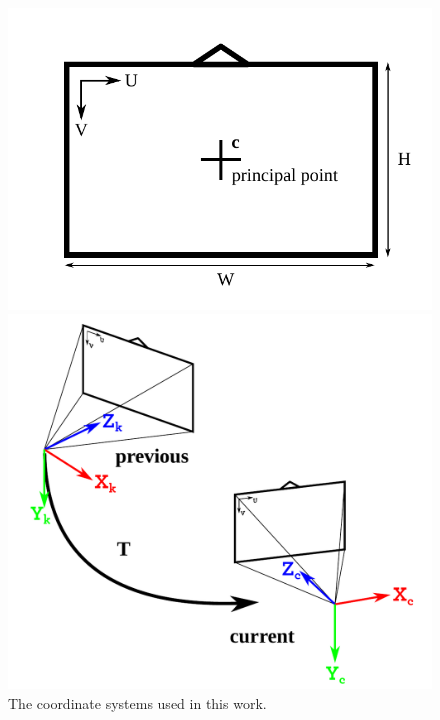\begin{figure}
    \begin{minipage}[t]{0.48\textwidth}
        \includegraphics[width = \textwidth]{images/coordinate_system_camera.pdf}
    \end{minipage}
    \hfill
    \begin{minipage}[t]{0.48\textwidth}
        \includegraphics[width = \textwidth]{images/coordinate_systems_3d.pdf}
    \end{minipage}
    \caption{The coordinate systems used in this work.}
    \label{fig:coordinate_systems}
\end{figure}

